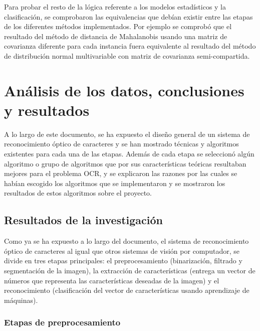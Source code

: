 \documentclass[a4paper, 11pt, oneside]{report}
\begin{document}
Para probar el resto de la lógica referente a los modelos estadísticos y la clasificación, se comprobaron las equivalencias que debían existir entre las etapas de los diferentes métodos implementados. Por ejemplo se comprobó que el resultado del método de distancia de Mahalanobis usando una matriz de covarianza diferente para cada instancia fuera equivalente al resultado del método de distribución normal multivariable con matriz de covarianza semi-compartida.

\chapter{Análisis de los datos, conclusiones y resultados}
\label{chap:results}

A lo largo de este documento, se ha expuesto el diseño general de un sistema de reconocimiento óptico de caracteres y se han mostrado técnicas y algoritmos existentes para cada una de las etapas. Además de cada etapa se seleccionó algún algoritmo o grupo de algoritmos que por sus características teóricas resultaban mejores para el problema OCR, y se explicaron las razones por las cuales se habían escogido los algoritmos que se implementaron y se mostraron los resultados de estos algoritmos sobre el proyecto.

\section{Resultados de la investigación}

Como ya se ha expuesto a lo largo del documento, el sistema de reconocimiento óptico de caracteres al igual que otros sistemas de visión por computador, se divide en tres etapas principales: el preprocesamiento (binarización, filtrado y segmentación de la imagen), la extracción de características (entrega un vector de números que representa las características deseadas de la imagen) y el reconocimiento (clasificación del vector de características usando aprendizaje de máquinas).

\subsection{Etapas de preprocesamiento}
\end{document}
